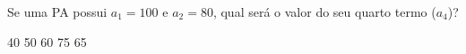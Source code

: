 Se uma PA possui $a_1 = 100$ e $a_2 = 80$, qual será o valor do seu quarto termo ($a_4$)?

40
50
60
75
65





